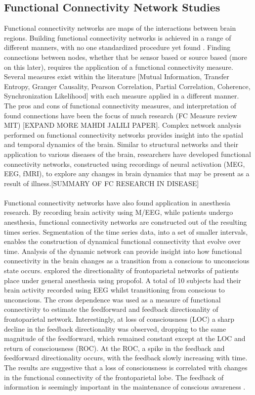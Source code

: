 \documentclass[11pt]{article}
\begin{document}
\subsection{Functional Connectivity Network Studies}
Functional connectivity networks are maps of the interactions between brain regions. Building functional connectivity networks is achieved in a range of different manners, with no one standardized procedure yet found \citep{fornito2013graph}. Finding connections between nodes, whether that be sensor based or source based (more on this later), requires the application of a functional connectivity measure. Several measures exist within the literature [Mutual Information, Transfer Entropy, Granger Causality, Pearson Correlation, Partial Correlation, Coherence, Synchronization Likelihood] with each measure applied in a different manner. The pros and cons of functional connectivity measures, and interpretation of found connections have been the focus of much research (FC Measure review MIT) [EXPAND MORE MAHDI JALILI PAPER]. Complex network analysis performed on functional connectivity networks provides insight into the spatial and temporal dynamics of the brain. Similar to structural networks and their application to various diseases of the brain, researchers have developed functional connectivity networks, constructed using recordings of neural activation (MEG, EEG, fMRI), to explore any changes in brain dynamics that may be present as a result of illness.[SUMMARY OF FC RESEARCH IN DISEASE]\\
\\ 
Functional connectivity networks have also found application in anesthesia research. By recording brain activity using M/EEG, while patients undergo anesthesia, functional connectivity networks are constructed out of the resulting times series. Segmentation of the time series data, into a set of smaller intervals, enables the construction of dynamical functional connectivity that evolve over time. Analysis of the dynamic network can provide insight into how functional connectivity in the brain changes as a transition from a conscious to unconscious state occurs. \citet{leeold} explored the directionality of frontoparietal networks of patients place under general anesthesia using propofol. A total of 10 subjects had their brain activity recorded using EEG whilst transitioning from conscious to unconscious. The cross dependence was used as a measure of functional connectivity to estimate the feedforward and feedback directionality of frontoparietal network. Interestingly, at loss of consciousness (LOC) a sharp decline in the feedback directionality was observed, dropping to the same magnitude of the feedforward, which remained constant except at the LOC and return of consciousness (ROC). At the ROC, a spike in the feedback and feedforward directionality occurs, with the feedback slowly increasing with time. The results are suggestive that a loss of consciousness is correlated with changes in the functional connectivity of the frontoparietal lobe. The feedback of information is seemingly important in the maintenance of conscious awareness \citep{leeold}.\\
\end{document}
